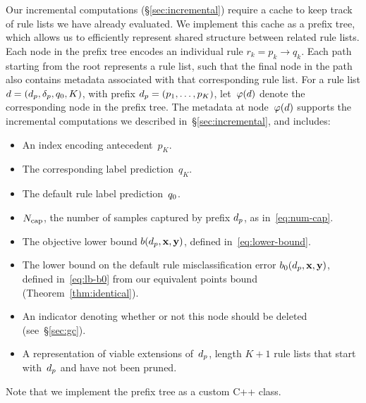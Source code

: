 Our incremental computations (\S\ref{sec:incremental}) require a
cache to keep track of rule lists we have already evaluated.
%
We implement this cache as a prefix tree, which allows us to efficiently
represent shared structure between related rule lists.
%
Each node in the prefix tree encodes an individual rule ${r_k = p_k \rightarrow q_k}$.
%
Each path starting from the root represents a rule list, such that the final node
in the path also contains metadata associated with that corresponding rule list.
%
For a rule list ${{d} = (d_p, \delta_p, q_0, K)}$,
with prefix ${d_p = (p_1, \dots, p_K)}$,
let~$\varphi({d})$ denote the corresponding node in the prefix tree.
%
The metadata at node~$\varphi({d})$ supports the incremental computations
we described in~\S\ref{sec:incremental}, and includes:
\begin{itemize}
\item An index encoding antecedent~$p_K$.
\item The corresponding label prediction~$q_K$.
\item The default rule label prediction~$q_0$.
\item $N_{\textnormal{cap}}$, the number of samples captured by prefix $d_p$, as in~\eqref{eq:num-cap}. %
\item The objective lower bound $b(d_p, \mathbf{x}, \mathbf{y})$, defined in~\eqref{eq:lower-bound}.
\item The lower bound on the default rule misclassification error
  $b_0(d_p, \mathbf{x}, \mathbf{y})$, defined in~\eqref{eq:lb-b0}
  from our equivalent points bound (Theorem~\ref{thm:identical}).
\item An indicator denoting whether or not this node should be deleted (see~\S\ref{sec:gc}).
\item A representation of viable extensions of~$d_p$,
  \ie length ${K+1}$ rule lists that start with~$d_p$ and have not been pruned.
\end{itemize}
Note that we implement the prefix tree as a custom C++ class. %
%
%

